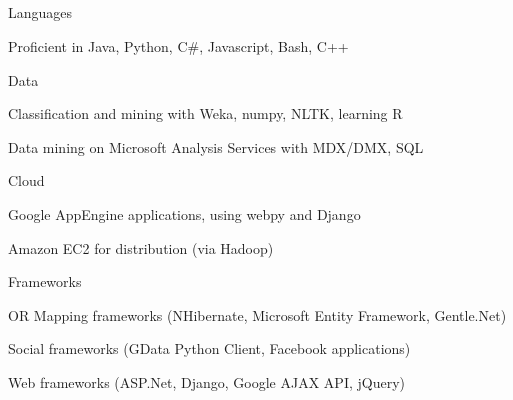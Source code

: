 \documentclass[a4paper,11pt,final]{article}
\newcommand{\resumetitle}[1]{%
  \subsection*{%
    \Large\sc{\textbf{#1}}%
  }%

}%
\newcommand{\resumedescheader}[1]{%
  \bigskip
  \resumetitle{#1}
}%
\newenvironment{resumedescription}{%
  \begin{basedescript}{\desclabelstyle{\multilinelabel}\desclabelwidth{0.15\linewidth}}{%
      \renewcommand{\makelabel}[1]{{##1}}%
    }%
      \setlength{\itemsep}{0pt}
}{%
  \end{basedescript}%
}
\begin{document}
\resumedescheader{Skills}
\begin{resumedescription}
\item [Languages]
\begin{itemize*}
  \item Proficient in Java, Python, C\#, Javascript, Bash, C++
\end{itemize*}

\item [Data]
\begin{itemize*}
  \item Classification and mining with Weka, numpy, NLTK, learning R
  \item Data mining on Microsoft Analysis Services with MDX/DMX, SQL
\end{itemize*}

\item [Cloud]
\begin{itemize*}
  \item Google AppEngine applications, using webpy and Django
  \item Amazon EC2 for distribution (via Hadoop)
\end{itemize*}

\item [Frameworks]
\begin{itemize*}
  \item OR Mapping frameworks (NHibernate, Microsoft Entity Framework, Gentle.Net)
  \item Social frameworks (GData Python Client, Facebook applications)
  \item Web frameworks (ASP.Net, Django, Google AJAX API, jQuery)
\end{itemize*}

\end{resumedescription}

\end{document}
